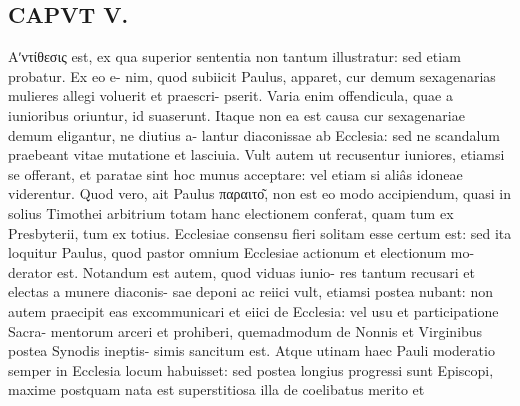\documentclass{article}
\begin{document}
\begin{pages}
\section*{CAPVT  V. }
\marginpar{[ p.281 ]}   Αʹντίθεσις est, ex qua superior sententia non tantum illustratur: sed etiam probatur. Ex eo e- nim, quod subiicit Paulus, apparet, cur demum sexagenarias mulieres allegi voluerit et praescri- pserit. Varia enim offendicula, quae a iunioribus oriuntur, id suaserunt. Itaque non ea est causa cur sexagenariae demum eligantur, ne diutius a- lantur diaconissae ab Ecclesia: sed ne scandalum praebeant vitae mutatione et lasciuia. Vult autem ut recusentur iuniores, etiamsi se offerant, et paratae sint hoc munus acceptare: vel etiam si aliâs idoneae viderentur. Quod vero, ait Paulus παραιτο͂, non est eo modo accipiendum, quasi in solius Timothei arbitrium totam hanc electionem conferat, quam tum ex Presbyterii, tum ex totius. Ecclesiae consensu fieri solitam esse certum est: sed ita loquitur Paulus, quod pastor omnium Ecclesiae actionum et electionum mo- derator est. Notandum est autem, quod viduas iunio- res tantum recusari et electas a munere diaconis- sae deponi ac reiici vult, etiamsi postea nubant: non autem praecipit eas excommunicari et eiici de Ecclesia: vel usu et participatione Sacra- mentorum arceri et prohiberi, quemadmodum de Nonnis et Virginibus postea Synodis ineptis- simis sancitum est. Atque utinam haec Pauli moderatio semper in Ecclesia locum habuisset: sed postea longius progressi sunt Episcopi, maxime postquam nata est superstitiosa illa de coelibatus merito et 

\end{pages}
\end{document}
